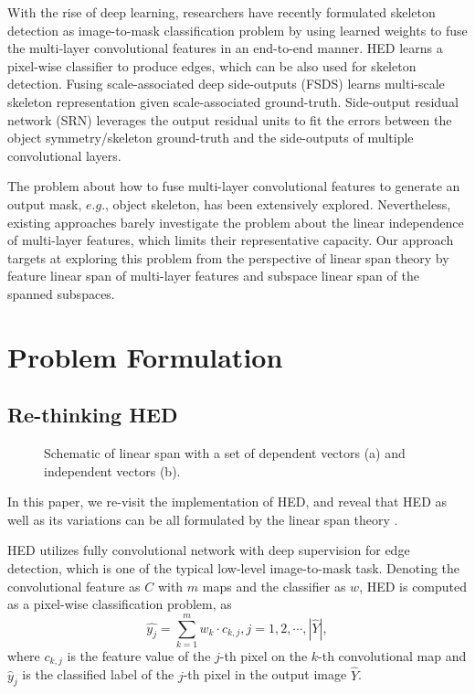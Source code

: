 \documentclass[runningheads]{llncs}
\begin{document}
With the rise of deep learning, researchers have recently formulated skeleton detection as image-to-mask classification problem by using learned weights to fuse the multi-layer convolutional features in an end-to-end manner. HED \cite{ref6} learns a pixel-wise classifier to produce edges, which can be also used for skeleton detection. Fusing scale-associated deep side-outputs (FSDS) \cite{ref7} learns multi-scale skeleton representation given scale-associated ground-truth. Side-output residual network (SRN) \cite{ref1} leverages the output residual units to fit the errors between the object symmetry/skeleton ground-truth and the side-outputs of multiple convolutional layers. 

The problem about how to fuse multi-layer convolutional features to generate an output mask, $e.g.$, object skeleton, has been extensively explored. Nevertheless, existing approaches barely investigate the problem about the linear independence of multi-layer features, which limits their representative capacity. Our approach targets at exploring this problem from the perspective of linear span theory by feature linear span of multi-layer features and subspace linear span of the spanned subspaces.

\section{Problem Formulation}

\subsection{Re-thinking HED}
\begin{figure}[t]
\centering
{}
\qquad\quad 
{} 
\caption{Schematic of linear span with a set of dependent vectors (a) and independent vectors (b).  }
\label{fig2:vector}
\end{figure}

In this paper, we re-visit the implementation of HED, and reveal  that HED as well as its variations can be all formulated by the linear span theory \cite{ref30}.


HED utilizes fully convolutional network with deep supervision for edge detection, which is one of the typical low-level image-to-mask task. Denoting the convolutional feature as $C$ with $m$ maps and the classifier as $w$, HED is computed as a pixel-wise classification problem, as
\begin{equation}{\hat {y_j}} = \sum\limits_{k = 1}^m {{w_k} \cdot {c_{k,j}}} ,j = 1,2, \cdots ,|{\hat Y}|,
   \label{hed::classifier}
\end{equation}
where ${c_{k,j}}$ is the feature value of the $j$-th pixel on the $k$-th convolutional map and ${\hat y_j}$ is the classified label of the $j$-th pixel in the output image ${\hat Y}$.
\end{document}
